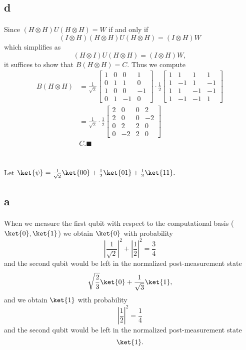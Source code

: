 \documentclass[letterpaper,12pt,oneside,onecolumn]{article}
\begin{document}
\subsection{d}
\paragraph{}
Since $(H\otimes H)U(H\otimes H) = W$ if and only if 
$$(I \otimes H)(H \otimes H) U(H \otimes H) = (I\otimes H) W$$
which simplifies as
$$(H\otimes I) U(H\otimes H) = (I \otimes H) W,$$
it suffices to show that $B (H\otimes H) = C$. Thus we compute
\begin{align*}B(H\otimes H) &= \frac{1}{\sqrt{2}} \begin{bmatrix} 1 & 0 & 0 & 1 \\ 0 & 1 & 1 & 0 \\ 1 & 0 & 0 & -1\\ 0 & 1 & -1 & 0\end{bmatrix}\cdot \frac{1}{2}\begin{bmatrix} 1 & 1 & 1 & 1 \\ 1 & - 1 & 1 & -1 \\ 1 & 1& -1 & -1 \\ 1 & -1 & -1 &1\end{bmatrix} \\
&=\frac{1}{\sqrt{2}}\cdot \frac{1}{2}\begin{bmatrix}2 &0 & 0 & 2 \\ 2 & 0 & 0 & -2 \\ 0 & 2 & 2 & 0 \\ 0 & -2 & 2 & 0 \end{bmatrix} \\
& C. \blacksquare\end{align*}
\newpage
\section{}
\paragraph{}
Let $\ket{\psi} = \frac{1}{\sqrt{2}}\ket{00} + \frac{1}{2}\ket{01} + \frac{1}{2}\ket{11}.$
\subsection{a}
\paragraph{}
When we measure the first qubit with respect to the computational basis ($\ket{0}, \ket{1}$) we obtain $\ket{0}$ with probability
$$|\frac{1}{\sqrt{2}}|^2 + |\frac{1}{2}|^2 = \frac{3}{4}$$
and the second qubit would be left in the normalized post-measurement state
$$\sqrt{\frac{2}{3}} \ket{0} + \frac{1}{\sqrt{3}} \ket{1},$$
and we obtain $\ket{1}$ with probability
$$|\frac{1}{2}|^2 = \frac{1}{4}$$
and the second qubit would be left in the normalized post-measurement state
$$\ket{1}.$$
\end{document}
